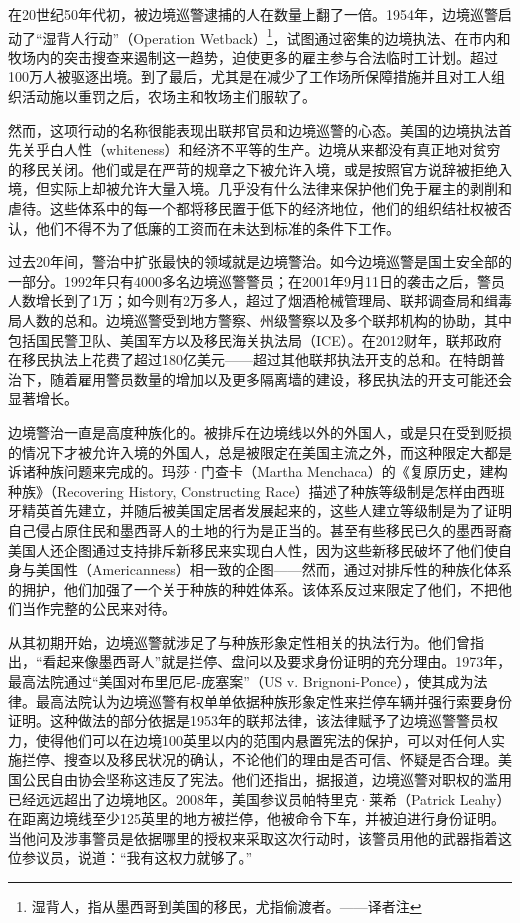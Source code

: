 \documentclass[fontset=fandol, a4paper, 12pt, openright]{ctexbook}
\begin{document}
在20世纪50年代初，被边境巡警逮捕的人在数量上翻了一倍。1954年，边境巡警启动了“湿背人行动”（Operation Wetback）\footnote{湿背人，指从墨西哥到美国的移民，尤指偷渡者。——译者注}，试图通过密集的边境执法、在市内和牧场内的突击搜查来遏制这一趋势，迫使更多的雇主参与合法临时工计划。超过100万人被驱逐出境。到了最后，尤其是在减少了工作场所保障措施并且对工人组织活动施以重罚之后，农场主和牧场主们服软了。

然而，这项行动的名称很能表现出联邦官员和边境巡警的心态。美国的边境执法首先关乎白人性（whiteness）和经济不平等的生产。边境从来都没有真正地对贫穷的移民关闭。他们或是在严苛的规章之下被允许入境，或是按照官方说辞被拒绝入境，但实际上却被允许大量入境。几乎没有什么法律来保护他们免于雇主的剥削和虐待。这些体系中的每一个都将移民置于低下的经济地位，他们的组织结社权被否认，他们不得不为了低廉的工资而在未达到标准的条件下工作。

过去20年间，警治中扩张最快的领域就是边境警治。如今边境巡警是国土安全部的一部分。1992年只有4000多名边境巡警警员；在2001年9月11日的袭击之后，警员人数增长到了1万；如今则有2万多人，超过了烟酒枪械管理局、联邦调查局和缉毒局人数的总和。边境巡警受到地方警察、州级警察以及多个联邦机构的协助，其中包括国民警卫队、美国军方以及移民海关执法局（ICE）。在2012财年，联邦政府在移民执法上花费了超过180亿美元——超过其他联邦执法开支的总和。在特朗普治下，随着雇用警员数量的增加以及更多隔离墙的建设，移民执法的开支可能还会显著增长。

边境警治一直是高度种族化的。被排斥在边境线以外的外国人，或是只在受到贬损的情况下才被允许入境的外国人，总是被限定在美国主流之外，而这种限定大都是诉诸种族问题来完成的。玛莎·门查卡（Martha Menchaca）的《复原历史，建构种族》（Recovering History, Constructing Race）描述了种族等级制是怎样由西班牙精英首先建立，并随后被美国定居者发展起来的，这些人建立等级制是为了证明自己侵占原住民和墨西哥人的土地的行为是正当的。甚至有些移民已久的墨西哥裔美国人还企图通过支持排斥新移民来实现白人性，因为这些新移民破坏了他们使自身与美国性（Americanness）相一致的企图——然而，通过对排斥性的种族化体系的拥护，他们加强了一个关于种族的种姓体系。该体系反过来限定了他们，不把他们当作完整的公民来对待。

从其初期开始，边境巡警就涉足了与种族形象定性相关的执法行为。他们曾指出，“看起来像墨西哥人”就是拦停、盘问以及要求身份证明的充分理由。1973年，最高法院通过“美国对布里厄尼-庞塞案”（US v. Brignoni-Ponce），使其成为法律。最高法院认为边境巡警有权单单依据种族形象定性来拦停车辆并强行索要身份证明。这种做法的部分依据是1953年的联邦法律，该法律赋予了边境巡警警员权力，使得他们可以在边境100英里以内的范围内悬置宪法的保护，可以对任何人实施拦停、搜查以及移民状况的确认，不论他们的理由是否可信、怀疑是否合理。美国公民自由协会坚称这违反了宪法。他们还指出，据报道，边境巡警对职权的滥用已经远远超出了边境地区。2008年，美国参议员帕特里克·莱希（Patrick Leahy）在距离边境线至少125英里的地方被拦停，他被命令下车，并被迫进行身份证明。当他问及涉事警员是依据哪里的授权来采取这次行动时，该警员用他的武器指着这位参议员，说道：“我有这权力就够了。”
\end{document}
